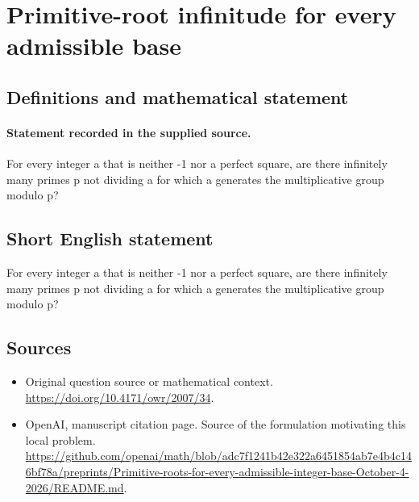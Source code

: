 \documentclass[11pt]{article}
\begin{document}
\section*{Primitive-root infinitude for every admissible base}\label{statement}
\subsection{Definitions and mathematical statement}
\paragraph{Statement recorded in the supplied source.}
For every integer a that is neither -1 nor a perfect square, are there infinitely many primes p not dividing a for which a generates the multiplicative group modulo p?
\subsection{Short English statement}
For every integer a that is neither -1 nor a perfect square, are there infinitely many primes p not dividing a for which a generates the multiplicative group modulo p?
\subsection{Sources}
\begin{itemize}
\item[S1] Original question source or mathematical context.
\url{https://doi.org/10.4171/owr/2007/34}.
\item[S2] OpenAI, manuscript citation page. Source of the formulation motivating this local problem.
\url{https://github.com/openai/math/blob/adc7f1241b42e322a6451854ab7e4b4c146bf78a/preprints/Primitive-roots-for-every-admissible-integer-base-October-4-2026/README.md}.
\end{itemize}
\end{document}
